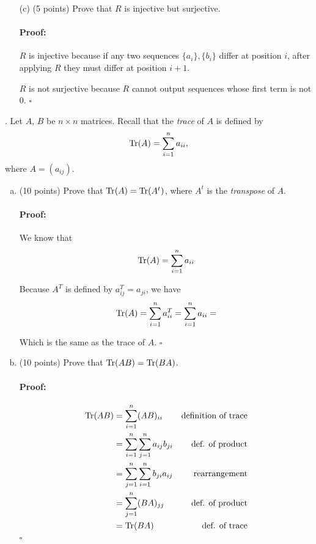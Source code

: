 \documentclass[12pt]{article}
\newcommand{\Tr}{{\rm Tr}}
\newenvironment{proof}{\paragraph{Proof:}}{\hfill$\square$}
\begin{document}
\begin{enumerate}
\begin{proof}
         $L$ is not injective: $L((0, a_1, a_2, \ldots)) = L((1, a_1, a_2, \ldots)) = (a_1, a_2,\ldots)$.
     \end{proof}
     \item[(c)] (5 points) Prove that $R$ is injective but surjective.
    
     \begin{proof}
         $R$ is injective because if any two sequences $\{a_i\}, \{b_i\}$ differ at position $i$, after applying $R$ they must differ at position $i+1$.
    
         $R$ is not surjective because $R$ cannot output sequences whose first term is not $0$.
     \end{proof}
    \end{enumerate}
    
    
    
    \newpage
    
    . Let $A$, $B$ be $n \times n$ matrices.  Recall that the \textit{trace} of $A$ is defined by
    \[ \Tr(A) = \sum_{i=1}^n a_{ii},\]
    where $A = (a_{ij})$.
    \begin{enumerate}[(a)]
     \item (10 points) Prove that $\Tr(A) = \Tr(A^t)$, where $A^t$ is the \textit{transpose} of $A$.
     \begin{proof}
     We know that
     \[ \Tr(A) = \sum_{i=1}^n a_{ii}\]
    
     Because $A^T$ is defined by $a^T_{ij} = a_{ji}$, we have
     \[ \Tr(A) = \sum_{i=1}^n a^T_{ii} =\sum_{i=1}^n a_{ii} =\]
    
     Which is the same as the trace of $A$.
     \end{proof}
    
     \item (10 points) Prove that $\Tr(AB) = \Tr(BA)$.
    
     \begin{proof}
      \begin{align*}
        \Tr(AB) &= \sum_{i=1}^n (AB)_{ii} & \text{definition of trace}\\
        &= \sum_{i=1}^n \sum_{j=1}^n a_{ij}b_{ji} &\text{def. of product}\\
        &= \sum_{j=1}^n \sum_{i=1}^n b_{ji}a_{ij} &\text{rearrangement}\\
        &= \sum_{j=1}^n (BA)_{jj} &\text{def. of product}\\
        &=\Tr(BA) &\text{def. of trace}
        \end{align*}
     \end{proof}
    \end{enumerate}
    
\end{document}
